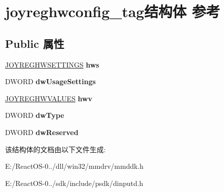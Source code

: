 \hypertarget{structjoyreghwconfig__tag}{}\section{joyreghwconfig\+\_\+tag结构体 参考}
\label{structjoyreghwconfig__tag}
\subsection*{Public 属性}
\begin{DoxyCompactItemize}
\item 
\mbox{\label{structjoyreghwconfig__tag_a31a56b6dc1d2294a5af496f0fc1105d7}} 
\hyperlink{structjoyreghwsettings__tag}{J\+O\+Y\+R\+E\+G\+H\+W\+S\+E\+T\+T\+I\+N\+GS} {\bfseries hws}
\item 
\mbox{\label{structjoyreghwconfig__tag_a3643172651b5de9d122ce30c89a9ba73}} 
D\+W\+O\+RD {\bfseries dw\+Usage\+Settings}
\item 
\mbox{\label{structjoyreghwconfig__tag_ae0336828e60553f049bb018e2702c27c}} 
\hyperlink{structjoyreghwvalues__tag}{J\+O\+Y\+R\+E\+G\+H\+W\+V\+A\+L\+U\+ES} {\bfseries hwv}
\item 
\mbox{\label{structjoyreghwconfig__tag_a583e42e490950a62a27327c1b30bcf0e}} 
D\+W\+O\+RD {\bfseries dw\+Type}
\item 
\mbox{\label{structjoyreghwconfig__tag_a623f3e29b7541521d2df3f49b39ed41b}} 
D\+W\+O\+RD {\bfseries dw\+Reserved}
\end{DoxyCompactItemize}


该结构体的文档由以下文件生成\+:\begin{DoxyCompactItemize}
\item 
E\+:/\+React\+O\+S-\/0../dll/win32/mmdrv/mmddk.\+h\item 
E\+:/\+React\+O\+S-\/0../sdk/include/psdk/dinputd.\+h\end{DoxyCompactItemize}
